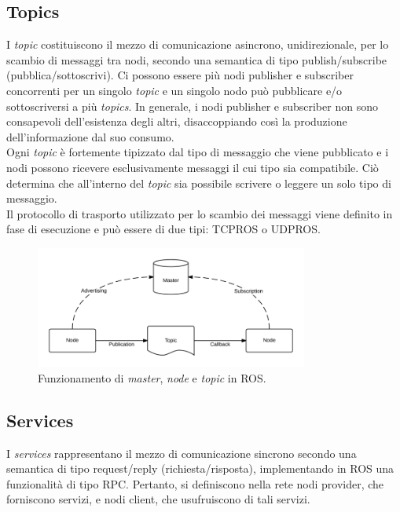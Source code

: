 \subsection{Topics}
I \emph{topic} costituiscono il mezzo di comunicazione asincrono, unidirezionale, per lo scambio di messaggi tra nodi, secondo una semantica di tipo publish/subscribe (pubblica/sottoscrivi). Ci possono essere più nodi publisher e subscriber concorrenti per un singolo \emph{topic} e un singolo nodo può pubblicare e/o sottoscriversi a più \emph{topics}. In generale, i nodi publisher e subscriber non sono consapevoli dell’esistenza degli altri, disaccoppiando così la produzione dell’informazione dal suo consumo.\\

Ogni \emph{topic} è fortemente tipizzato dal tipo di messaggio che viene pubblicato e i nodi possono ricevere esclusivamente messaggi il cui tipo sia compatibile. Ciò determina che all’interno del \emph{topic} sia possibile scrivere o leggere un solo tipo di messaggio.\\

Il protocollo di trasporto utilizzato per lo scambio dei messaggi viene definito in fase di esecuzione e può essere di due tipi: TCPROS o UDPROS.

\begin{figure}[H]
    \centering
    \includegraphics[width=0.8\textwidth]{gfx/master_node_topic}
    \caption[Funzionamento di \emph{master}, \emph{node} e \emph{topic} in \acs{ROS}.]{Funzionamento di \emph{master}, \emph{node} e \emph{topic} in \acs{ROS}.}
    \label{fig:master_node_topic}
\end{figure}

\subsection{Services}
I \emph{services} rappresentano il mezzo di comunicazione sincrono secondo una semantica di tipo request/reply (richiesta/risposta), implementando in \acs{ROS} una funzionalità di tipo \ac{RPC}. Pertanto, si definiscono nella rete nodi provider, che forniscono servizi, e nodi client, che usufruiscono di tali servizi.\\

